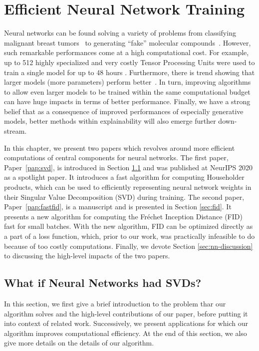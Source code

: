 \documentclass[11pt,a4paper,twoside,openright,final]{memoir}
\newcommand\contribution[1]{\hspace{0.5em}\hyperref[#1]{\ding{81}}}
\newcommand*{\paperref}[1]{Paper~\hyperref[#1]{\ref{#1}}}
\begin{document}
\chapter{Efficient Neural Network Training}\label{chap:nns}
Neural networks can be found solving a variety of problems from classifying malignant breast tumors~\cite{cancer} to generating ``fake'' molecular compounds~\cite{chem-gan}. 
However, such remarkable performances come at a high computational cost.
For example, up to 512 highly specialized and very costly Tensor Processing Units were used to train a single model for up to 48 hours \cite{biggan}. 
Furthermore, there is trend showing that larger models (more parameters) perform better~\cite{language-models-few-shot, scaling-matters}.
In turn, improving algorithms to allow even larger models to be trained within the same computational budget can have huge impacts in terms of better performance.
Finally, we have a strong belief that as a consequence of improved performances of especially generative models, better methods within explainability will also emerge further down-stream.

In this chapter, we present two papers which revolves around more efficient computations of central components for neural networks.
The first paper, \paperref{pap:svd}, is introduced in Section \ref{sec:svd} and was published at NeurIPS 2020 as a spotlight paper.
It introduces a fast algorithm for computing Householder products, which can be used to efficiently representing neural network weights in their Singular Value Decomposition (SVD) during training.
The second paper, \paperref{pap:fastfid}, is a manuscript and is presented in Section \ref{sec:fid}. 
It presents a new algorithm for computing the Fr\'echet Inception Distance (FID) fast for small batches.
With the new algorithm, FID can be optimized directly as a part of a loss function, which, prior to our work, was practically infeasible to do because of too costly computations. 
Finally, we devote Section \ref{sec:nn-discussion} to discussing the high-level impacts of the two papers. 

\section{What if Neural Networks had SVDs?\contribution{pap:svd}} \label{sec:svd}
In this section, we first give a brief introduction to the problem thar our algorithm solves and the high-level contributions of our paper, before putting it into context of related work. Successively, we present applications for which our algorithm improves computational efficiency.
At the end of this section, we also give more details on the details of our algorithm.
\end{document}

